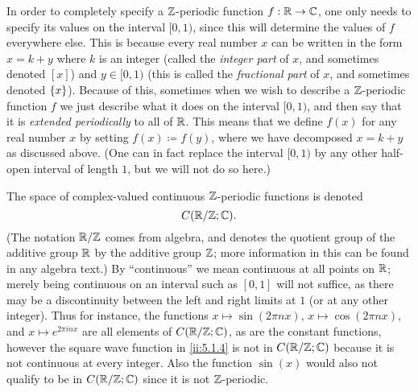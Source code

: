 \begin{note}
  In order to completely specify a \(\mathbb{Z}\)-periodic function \(f : \mathbb{R} \to \mathbb{C}\), one only needs to specify its values on the interval \([0, 1)\), since this will determine the values of \(f\) everywhere else.
  This is because every real number \(x\) can be written in the form \(x = k + y\) where \(k\) is an integer (called the \emph{integer part} of \(x\), and sometimes denoted \([x]\)) and \(y \in [0, 1)\) (this is called the \emph{fractional part} of \(x\), and sometimes denoted \(\left\lbrace x\right\rbrace\)).
  Because of this, sometimes when we wish to describe a \(\mathbb{Z}\)-periodic function \(f\) we just describe what it does on the interval \([0, 1)\), and then say that it is \emph{extended periodically} to all of \(\mathbb{R}\).
  This means that we define \(f(x)\) for any real number \(x\) by setting \(f(x) \coloneqq f(y)\), where we have decomposed \(x = k + y\) as discussed above.
  (One can in fact replace the interval \([0, 1)\) by any other half-open interval of length \(1\), but we will not do so here.)
\end{note}

\begin{note}
  The space of complex-valued continuous \(\mathbb{Z}\)-periodic functions is denoted
  \[
    C(\mathbb{R} / \mathbb{Z} ; \mathbb{C}).
  \]
  (The notation \(\mathbb{R} / \mathbb{Z}\) comes from algebra, and denotes the quotient group of the additive group \(\mathbb{R}\) by the additive group \(\mathbb{Z}\);
  more information in this can be found in any algebra text.)
  By ``continuous'' we mean continuous at all points on \(\mathbb{R}\);
  merely being continuous on an interval such as \([0, 1]\) will not suffice, as there may be a discontinuity between the left and right limits at \(1\) (or at any other integer).
  Thus for instance, the functions \(x \mapsto \sin(2 \pi n x)\), \(x \mapsto \cos(2 \pi n x)\), and \(x \mapsto e^{2 \pi i n x}\) are all elements of \(C(\mathbb{R} / \mathbb{Z} ; \mathbb{C})\), as are the constant functions, however the square wave function in \cref{ii:5.1.4} is not in \(C(\mathbb{R} / \mathbb{Z} ; \mathbb{C})\) because it is not continuous at every integer.
  Also the function \(\sin(x)\) would also not qualify to be in \(C(\mathbb{R} / \mathbb{Z} ; \mathbb{C})\) since it is not \(\mathbb{Z}\)-periodic.
\end{note}

